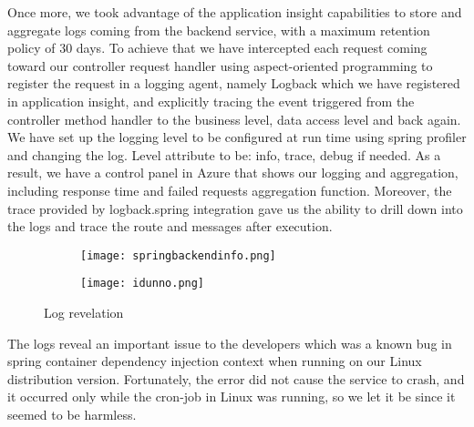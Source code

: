 Once more, we took advantage of the application insight capabilities to store and aggregate logs coming from the backend service, with a maximum retention policy of 30 days. To achieve that we have intercepted each request coming toward our controller request handler using aspect-oriented programming to register the request in a logging agent, namely Logback which we have registered in application insight, and explicitly tracing the event triggered from the controller method handler to the business level, data access level and back again. We have set up the logging level to be configured at run time using spring profiler and changing the log. Level attribute to be: info, trace, debug if needed. As a result, we have a control panel in Azure that shows our logging and aggregation, including response time and failed requests aggregation function. Moreover, the trace provided by logback.spring integration gave us the ability to drill down into the logs and trace the route and messages after execution.
\begin{figure}
    \centering
    \begin{subfigure}[b]{0.45\textwidth}
        \texttt{[image: springbackendinfo.png]}
    \end{subfigure}
    \hfill
    \begin{subfigure}[b]{0.45\textwidth}
        \texttt{[image: idunno.png]}
    \end{subfigure}
    \caption{Log revelation}
    \label{fig:screenshots}
\end{figure}
The logs reveal an important issue to the developers which was a known bug in spring container dependency injection context when running on our Linux distribution version. Fortunately, the error did not cause the service to crash, and it occurred only while the cron-job in Linux was running, so we let it be since it seemed to be harmless.
